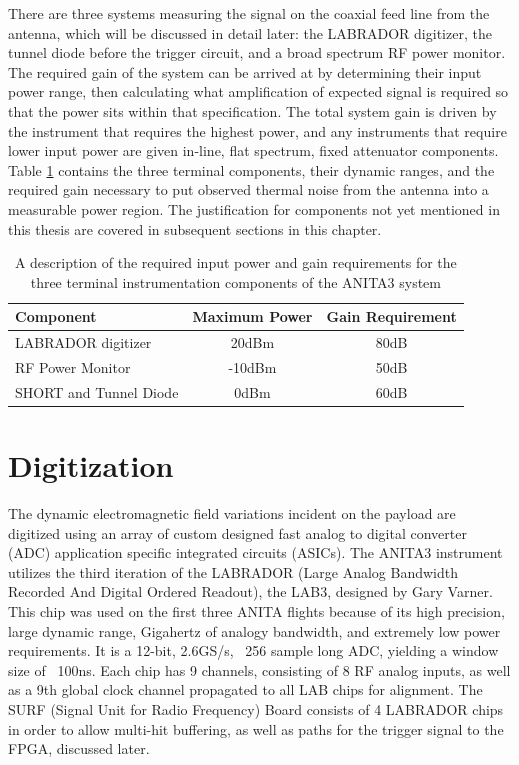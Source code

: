 		There are three systems measuring the signal on the coaxial feed line from the antenna, which will be discussed in detail later: the LABRADOR digitizer, the tunnel diode before the trigger circuit, and a broad spectrum RF power monitor.  The required gain of the system can be arrived at by determining their input power range, then calculating what amplification of expected signal is required so that the power sits within that specification.  The total system gain is driven by the instrument that requires the highest power, and any instruments that require lower input power are given in-line, flat spectrum, fixed attenuator components.  Table \ref{tab:rfLinkBudget} contains the three terminal components, their dynamic ranges, and the required gain necessary to put observed thermal noise from the antenna into a measurable power region.  The justification for components not yet mentioned in this thesis are covered in subsequent sections in this chapter.
	
\begin{table}
	\centering
	\begin{tabular}{| l | c | c |}
		\hline
		Component & Maximum Power & Gain Requirement\\
		\hline
		LABRADOR digitizer & 20dBm & 80dB \\
		RF Power Monitor & -10dBm & 50dB \\
		SHORT and Tunnel Diode & 0dBm & 60dB \\
		\hline
	\end{tabular}
	\caption{A description of the required input power and gain requirements for the three terminal instrumentation components of the ANITA3 system}
	\label{tab:rfLinkBudget}
\end{table}
	


	
\section{Digitization}
	The dynamic electromagnetic field variations incident on the payload are digitized using an array of custom designed fast analog to digital converter (ADC) application specific integrated circuits (ASICs).  The ANITA3 instrument utilizes the third iteration of the LABRADOR (Large Analog Bandwidth Recorded And Digital Ordered Readout), the LAB3, designed by Gary Varner\cite{LABASICPAPER}.  This chip was used on the first three ANITA flights because of its high precision, large dynamic range, Gigahertz of analogy bandwidth, and extremely low power requirements.   It is a 12-bit, 2.6GS/s, ~256 sample long ADC, yielding a window size of ~100ns.  Each chip has 9 channels, consisting of 8 RF analog inputs, as well as a 9th global clock channel propagated to all LAB chips for alignment.  The SURF (Signal Unit for Radio Frequency) Board consists of 4 LABRADOR chips in order to allow multi-hit buffering, as well as paths for the trigger signal to the FPGA, discussed later.


